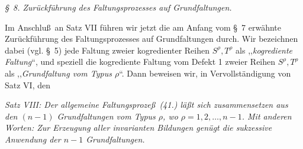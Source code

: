 \begin{center}
\emph{\S\ 8. Zur\"uckf\"uhrung des Faltungsprozesses auf Grundfaltungen.}
\end{center}
Im Anschlu\ss\ an Satz VII f\"uhren wir jetzt die am Anfang vom \S\ 7 erw\"ahnte Zur\"uckf\"uhrung des Faltungsprozesses auf Grundfaltungen durch. Wir bezeichnen dabei (vgl. \S\ 5) jede Faltung zweier kogredienter Reihen $S^\rho,T^\rho$ als ,,\emph{kogrediente Faltung}``, und speziell die kogrediente Faltung vom Defekt 1 zweier Reihen $S^\rho,T^\rho$ als ,,\emph{Grundfaltung vom Typus $\rho$}``. Dann beweisen wir, in Vervollst\"andigung von Satz VI, den

\emph{Satz VIII: Der allgemeine Faltungsproze\ss\ (41.) l\"a\ss t sich zusammensetzen aus den $(n-1)$ Grundfaltungen vom Typus $\rho$, wo $\rho=1,2,\ldots,n-1$. Mit anderen Worten: Zur Erzeugung aller invarianten Bildungen gen\"ugt die sukzessive Anwendung der $n-1$ Grundfaltungen.}

